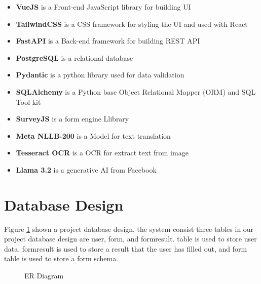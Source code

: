 \documentclass[12pt,oneside,openright,a4paper]{cpe-english-project}
\begin{document}
\begin{itemize}
\item  \textbf{VueJS} is a Front-end JavaScript library for building UI
\item \textbf{TailwindCSS} is a CSS framework for styling the UI and used with React
\item \textbf{FastAPI} is a Back-end framework for building REST API
\item \textbf{PostgreSQL}  is a relational database
\item \textbf{Pydantic}  is a python library used for data validation 
\item \textbf{SQLAlchemy} is a Python base Object Relational Mapper (ORM) and SQL Tool kit
\item \textbf{SurveyJS} is a form engine Llibrary
\item \textbf{Meta NLLB-200} is a Model for text translation
\item \textbf{Tesseract OCR} is a OCR for extract text from image
\item \textbf{Llama 3.2} is a generative AI from Facebook
\end{itemize}


\section{Database Design}

Figure \ref{fig:er-diagram} shown a project database design, the system consist three tables in our project database design are user, form, and formresult. table is used to store user data, formresult is used to store a result that the user has filled out, and form table is used to store a form schema.

\begin{figure}[!h]
\centering
{}
\caption{ER Diagram}\label{fig:er-diagram}
\end{figure}
\end{document}
